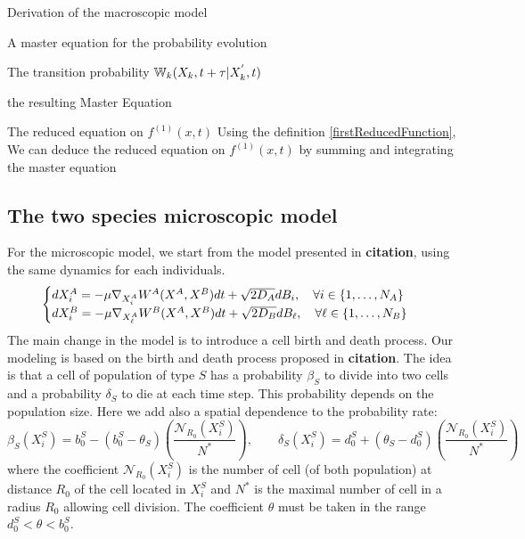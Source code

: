 \begin{paragraph}{Derivation of the macroscopic model}
\begin{paragraph}{A master equation for the probability evolution}
\begin{paragraph}{The transition probability ${\mathbb{W}}_k(X_k, t+\tau \vert X_k^{'},t)$}
\begin{paragraph}{the resulting Master Equation}
\end{paragraph}

\end{paragraph}

\end{paragraph}

\begin{paragraph}{The reduced equation on $f^{(1)}(x,t)$}
Using the definition \eqref{firstReducedFunction}, We can deduce the reduced equation on $f^{(1)}(x,t)$ by summing and integrating the master equation
\end{paragraph}

\end{paragraph}


\subsection{The two species microscopic model}
	For the microscopic model, we start from the model presented in \textbf{citation}, using the same dynamics for each individuals.
	\begin{equation}
	\begin{cases}
	d X_i^{A}=-\mu \nabla_{X_{i}^{A}}W^{A}(X^{A},X^{B})dt + \sqrt{2D_{A}} d B_{i}, \quad \forall i \in\{1, \dots, N_{A}\}
	\\
	d X_i^{B}=-\mu \nabla_{X_{{\ell}}^{A}}W^{B}(X^{A},X^{B})dt + \sqrt{2D_{B}} d B_{{\ell}}, \quad \forall {\ell} \in \{1, \dots, N_{B}\}
	\end{cases}
	\label{micro}
	\end{equation}
		The main change in the model is to introduce a cell birth and death process. Our modeling is based on the birth and death process proposed in \textbf{citation}. The idea is that a cell of population of type $S$ has a probability $\beta_S$ to divide into two cells and a probability $\delta_S$ to die at each time step. This probability depends on the population size. Here we add also a spatial dependence to the probability rate:
	\begin{equation}
\beta_{S}(X_i^S)=b_{0}^{S}-(b_{0}^{S}-\theta_{S})\left(\frac{\mathcal{N}_{R_0}(X_i^S)}{N^{*}}\right), \quad\quad \delta_{S}(X_i^S)=d_{0}^{S}+(\theta_{S}-d_{0}^{S})\left(\frac{\mathcal{N}_{R_0}(X_i^S)}{N^{*}}\right)
\end{equation}
	where the coefficient $\mathcal{N}_{R_0}(X_i^S)$ is the number of cell (of both population) at distance $R_0$ of the cell located in $X_i^S$ and $N^*$ is the maximal number of cell in a radius $R_0$ allowing cell division. The coefficient $\theta$ must be taken in the range $d_{0}^{S}<\theta<b_{0}^{S}$.


